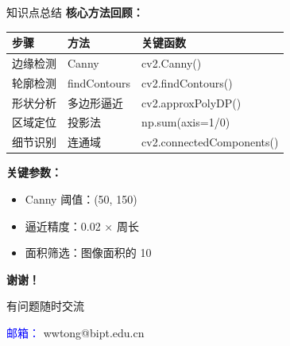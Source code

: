 \begin{frame}{知识点总结}
    \textbf{核心方法回顾：}
    \begin{table}
        \centering
        \small
        \begin{tabular}{llp{5cm}}
            \toprule
            \textbf{步骤} & \textbf{方法} & \textbf{关键函数} \\
            \midrule
            边缘检测 & Canny & cv2.Canny() \\
            轮廓检测 & findContours & cv2.findContours() \\
            形状分析 & 多边形逼近 & cv2.approxPolyDP() \\
            区域定位 & 投影法 & np.sum(axis=1/0) \\
            细节识别 & 连通域 & cv2.connectedComponents() \\
            \bottomrule
        \end{tabular}
    \end{table}

    \vspace{0.3cm}

    \textbf{关键参数：}
    \begin{itemize}
        \item Canny 阈值：(50, 150)
        \item 逼近精度：0.02 × 周长
        \item 面积筛选：图像面积的 10%
    \end{itemize}
\end{frame}

\begin{frame}
    \begin{center}
        \Huge \textbf{谢谢！}

        \vspace{1cm}

        \Large 有问题随时交流

        \vspace{0.5cm}

        \normalsize
        \textcolor{blue}{邮箱：} wwtong@bipt.edu.cn
    \end{center}
\end{frame}
